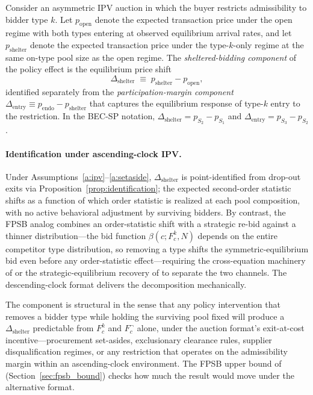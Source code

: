 \begin{definition}\label{def:sheltered}
Consider an asymmetric IPV auction in which the buyer restricts admissibility to bidder type $k$. Let $p_{\text{open}}$ denote the expected transaction price under the open regime with both types entering at observed equilibrium arrival rates, and let $p_{\text{shelter}}$ denote the expected transaction price under the type-$k$-only regime at the same on-type pool size as the open regime. The \emph{sheltered-bidding component} of the policy effect is the equilibrium price shift
\[
\Delta_{\text{shelter}} \;\equiv\; p_{\text{shelter}} - p_{\text{open}},
\]
identified separately from the \emph{participation-margin component} $\Delta_{\text{entry}} \equiv p_{\text{endo}} - p_{\text{shelter}}$ that captures the equilibrium response of type-$k$ entry to the restriction. In the BEC-SP notation, $\Delta_{\text{shelter}} = p_{S_2} - p_{S_1}$ and $\Delta_{\text{entry}} = p_{S_3} - p_{S_2}$.
\end{definition}

\paragraph{Identification under ascending-clock IPV.} Under Assumptions~\ref{a:ipv}--\ref{a:setaside}, $\Delta_{\text{shelter}}$ is point-identified from drop-out exits via Proposition~\ref{prop:identification}; the expected second-order statistic shifts as a function of which order statistic is realized at each pool composition, with no active behavioral adjustment by surviving bidders. By contrast, the FPSB analog combines an order-statistic shift with a strategic re-bid against a thinner distribution---the bid function $\beta(c; F^k_c, N)$ depends on the entire competitor type distribution, so removing a type shifts the symmetric-equilibrium bid even before any order-statistic effect---requiring the cross-equation machinery of \citet{krasnokutskaya2011} or the strategic-equilibrium recovery of \citet{lebrun1999} to separate the two channels. The descending-clock format delivers the decomposition mechanically.

The component is structural in the sense that any policy intervention that removes a bidder type while holding the surviving pool fixed will produce a $\Delta_{\text{shelter}}$ predictable from $F_c^k$ and $F_c^{\neg}$ alone, under the auction format's exit-at-cost incentive---procurement set-asides, exclusionary clearance rules, supplier disqualification regimes, or any restriction that operates on the admissibility margin within an ascending-clock environment. The FPSB upper bound of \citet{maskinriley2000} (Section~\ref{sec:fpsb_bound}) checks how much the result would move under the alternative format.

